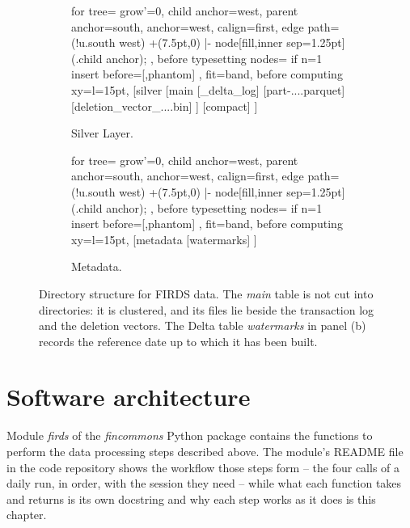 \begin{figure}[h]
	\centering
	\begin{subfigure}[t]{0.40\textwidth}
		\centering
		\begin{forest}
			for tree={
				grow'=0,
				child anchor=west,
				parent anchor=south,
				anchor=west,
				calign=first,
				edge path={
					\noexpand{}
					(!u.south west) +(7.5pt,0) |- node[fill,inner sep=1.25pt] {} (.child anchor);
				},
				before typesetting nodes={
					if n=1
					{insert before={[,phantom]}}
					{}
				},
				fit=band,
				before computing xy={l=15pt},
			}
			[silver
				[main
					[\_delta\_log]
					[part-....parquet]
					[deletion\_vector\_....bin]
				]
				[compact]
			]
		\end{forest}
		\caption{Silver Layer.}
	\end{subfigure}
	\hfill
	\begin{subfigure}[t]{0.40\textwidth}
		\centering
		\begin{forest}
			for tree={
				grow'=0,
				child anchor=west,
				parent anchor=south,
				anchor=west,
				calign=first,
				edge path={
					\noexpand{}
					(!u.south west) +(7.5pt,0) |- node[fill,inner sep=1.25pt] {} (.child anchor)\forestoption{edge label};
				},
				before typesetting nodes={
					if n=1
					{insert before={[,phantom]}}
					{}
				},
				fit=band,
				before computing xy={l=15pt},
			}
			[metadata
				[watermarks]
			]
		\end{forest}
		\caption{Metadata.}
	\end{subfigure}
	\caption{Directory structure for FIRDS data. The \emph{main} table is not cut into directories: it is clustered, and its files lie beside the transaction log and the deletion vectors. The Delta table \emph{watermarks} in panel (b) records the reference date up to which it has been built.\label{fig:dirstruct_firds_silver_gold}}
\end{figure}






\section{Software architecture}

Module \emph{firds} of the \emph{fincommons} Python package contains the functions to perform the data processing steps described above. The module's README file in the code repository shows the workflow those steps form -- the four calls of a daily run, in order, with the session they need -- while what each function takes and returns is its own docstring and why each step works as it does is this chapter.

